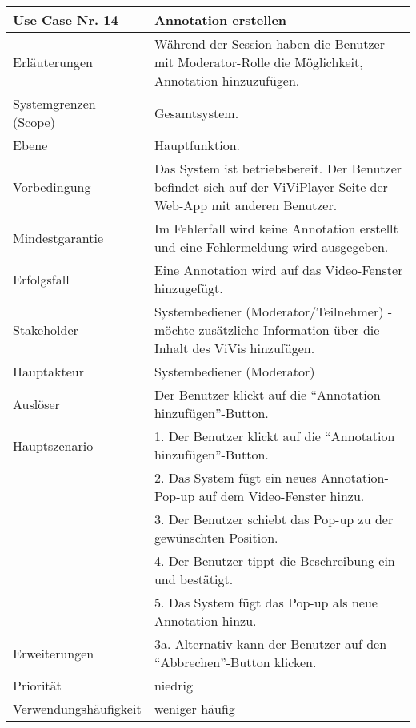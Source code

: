 \begin{tabularx}{\linewidth}{|l|X|}
	\hline
	Use Case Nr. 14			& \textbf{Annotation erstellen} \\ \hline
	Erläuterungen			& Während der Session haben die Benutzer mit Moderator-Rolle die 
							  Möglichkeit, Annotation hinzuzufügen. \\ \hline
	Systemgrenzen (Scope)	& Gesamtsystem. \\ \hline
	Ebene					& Hauptfunktion. \\ \hline
	Vorbedingung			& Das System ist betriebsbereit. Der Benutzer befindet sich auf 
							  der ViViPlayer-Seite der Web-App mit anderen Benutzer. \\ \hline
	Mindestgarantie			& Im Fehlerfall wird keine Annotation erstellt und eine 
							  Fehlermeldung wird ausgegeben. \\ \hline
	Erfolgsfall				& Eine Annotation wird auf das Video-Fenster hinzugefügt. \\ 
							  \hline
	Stakeholder				& Systembediener (Moderator/Teilnehmer) - möchte zusätzliche 
							  Information über die Inhalt des ViVis hinzufügen. \\ \hline
	Hauptakteur				& Systembediener (Moderator) \\ \hline
	Auslöser				& Der Benutzer klickt auf die ``Annotation hinzufügen''-Button. 
							  \\ \hline	
	Hauptszenario			& 1. Der Benutzer klickt auf die ``Annotation hinzufügen''-Button. 
							  \\
							& 2. Das System fügt ein neues Annotation-Pop-up auf dem 
							  Video-Fenster hinzu. \\
							& 3. Der Benutzer schiebt das Pop-up zu der gewünschten Position. \\
							& 4. Der Benutzer tippt die Beschreibung ein und bestätigt. \\
							& 5. Das System fügt das Pop-up als neue Annotation hinzu. \\ \hline
	Erweiterungen			& 3a. Alternativ kann der Benutzer auf den ``Abbrechen''-Button klicken.\\ 
							  \hline
	Priorität				& niedrig \\ \hline
	Verwendungshäufigkeit	& weniger häufig  \\ \hline
\end{tabularx}

